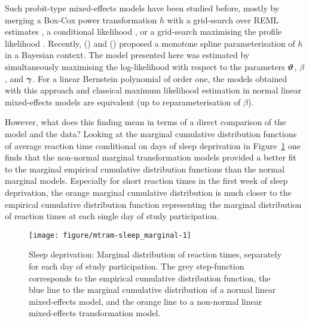 \documentclass[article,nojss,shortnames]{jss}\usepackage[]{graphicx}\usepackage[]{xcolor}
\newcommand{\THcite}[2]{\citeauthor{#2} (\citeyear{#2})}
\newcommand{\h}{h}
\newcommand{\parm}{\varthetavec}
\newcommand{\varparm}{\gammavec}
\newcommand{\eshiftparm}{\beta}
\def \gammavec        {\text{\boldmath$\gamma$}}
\def \varthetavec     {\text{\boldmath$\vartheta$}}
\begin{document}
Such probit-type mixed-effects models have been studied before, mostly by merging a
Box-Cox power transformation $\h$ with a grid-search over REML estimates
\citep{Gurka_Edwards_2006}, a conditional likelihood
\citep{Hutmacher_French_2011}, or a grid-search maximising the profile
likelihood \citep{Maruo_Yamaguchi_2017}.  Recently, \THcite{Tang, Wu, and
Chen}{Tang_Wu_Chen_2018} and \THcite{Wu and Wang}{Wu_Wang_2019}
proposed a monotone spline parameterisation of $\h$ in a Bayesian context.
The model presented here was estimated by simultaneously maximising the
log-likelihood \citep{Hothorn_2019_mtram} %
with respect to the parameters $\parm$,
$\eshiftparm$, and $\varparm$. For a linear Bernstein polynomial of order
one, the models obtained with this approach and classical maximum likelihood
estimation in normal linear mixed-effects models are equivalent (up to
reparameterisation of $\eshiftparm$).%

However, what does this finding mean in terms of a direct comparison of the
model and the data?  Looking at the marginal cumulative distribution
functions of average reaction time conditional on days of sleep deprivation
in Figure~\ref{fig:sleepstudy_ecdf} one finds that the non-normal marginal
transformation models provided a better fit to the marginal empirical
cumulative distribution functions than the normal marginal models. 
Especially for short reaction times in the first week of sleep deprivation,
the orange marginal cumulative distribution is much closer to the
empirical cumulative distribution function representing the marginal
distribution of reaction times at each single day of study participation.

\begin{figure}[t]
\begin{Schunk}


{\centering \texttt{[image: figure/mtram-sleep\_marginal-1]} 

}

\end{Schunk}
\caption{Sleep deprivation: Marginal distribution of reaction times, separately for each day of
         study participation. The grey step-function corresponds to the
         empirical cumulative distribution function, the blue line to the
         marginal cumulative distribution of a normal linear mixed-effects model, and
         the orange line to a non-normal linear mixed-effects transformation
         model. \label{fig:sleepstudy_ecdf}}
\end{figure}
\end{document}

